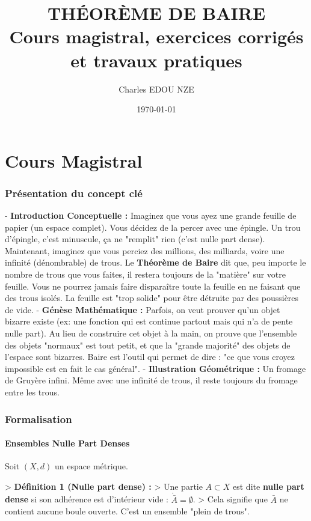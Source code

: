 \documentclass[11pt,a4paper]{article}
\title{\Huge THÉORÈME DE BAIRE \\ \large Cours magistral, exercices corrigés et travaux pratiques}
\author{\Large Charles EDOU NZE}
\date{\today}
\begin{document}
\maketitle
\tableofcontents
\newpage

\part{Cours Magistral}


\section{Présentation du concept clé}

- \textbf{Introduction Conceptuelle :} Imaginez que vous ayez une grande feuille de papier (un espace complet). Vous décidez de la percer avec une épingle. Un trou d'épingle, c'est minuscule, ça ne "remplit" rien (c'est nulle part dense). Maintenant, imaginez que vous perciez des millions, des milliards, voire une infinité (dénombrable) de trous. Le \textbf{Théorème de Baire} dit que, peu importe le nombre de trous que vous faites, il restera toujours de la "matière" sur votre feuille. Vous ne pourrez jamais faire disparaître toute la feuille en ne faisant que des trous isolés. La feuille est "trop solide" pour être détruite par des poussières de vide.
- \textbf{Génèse Mathématique :} Parfois, on veut prouver qu'un objet bizarre existe (ex: une fonction qui est continue partout mais qui n'a de pente nulle part). Au lieu de construire cet objet à la main, on prouve que l'ensemble des objets "normaux" est tout petit, et que la "grande majorité" des objets de l'espace sont bizarres. Baire est l'outil qui permet de dire : "ce que vous croyez impossible est en fait le cas général".
- \textbf{Illustration Géométrique :} Un fromage de Gruyère infini. Même avec une infinité de trous, il reste toujours du fromage entre les trous.

\section{Formalisation}

\subsection{Ensembles Nulle Part Denses}

Soit $(X, d)$ un espace métrique.

> \textbf{Définition 1 (Nulle part dense) :}
> Une partie $A \subset X$ est dite \textbf{nulle part dense} si son adhérence est d'intérieur vide : $\mathring{\bar{A}} = \emptyset$.
> Cela signifie que $\bar{A}$ ne contient aucune boule ouverte. C'est un ensemble "plein de trous".
\end{document}
